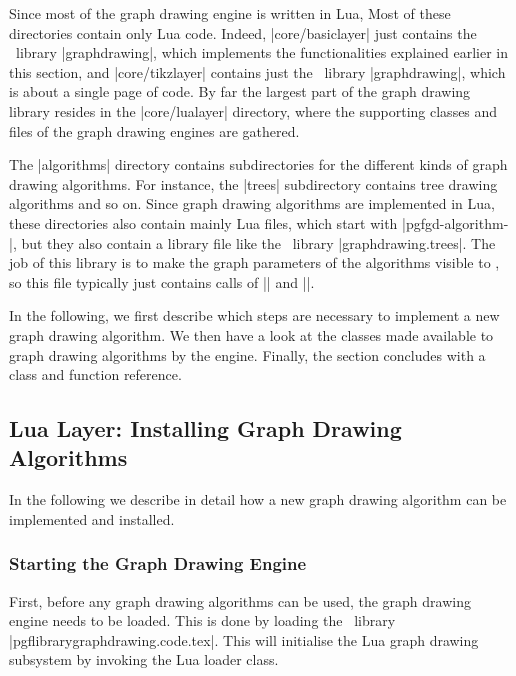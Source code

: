 Since most of the graph drawing engine is written in Lua, Most of
these directories contain only Lua code. Indeed, |core/basiclayer|
just contains the \pgfname\ library |graphdrawing|, which implements
the functionalities explained earlier in this section, and
|core/tikzlayer| contains just the \tikzname\ library |graphdrawing|,
which is about a single page of code. By far the largest part of the
graph drawing library resides in the |core/lualayer| directory, where
the supporting classes and files of the graph drawing engines are
gathered.

The |algorithms| directory contains subdirectories for the different
kinds of graph drawing algorithms. For instance, the |trees|
subdirectory contains tree drawing algorithms and so on. Since graph
drawing algorithms are implemented in Lua, these directories also
contain mainly Lua files, which start with |pgfgd-algorithm-|, but
they also contain a library file like the \pgfname\ library
|graphdrawing.trees|. The job of this library is to make the graph
parameters of the algorithms visible to \pgfname, so this file
typically just contains calls of |\pgfgddeclarealgorithmkey| and
|\pgfgddeclareforwardedkeys|.

In the following, we first describe which steps are necessary to
implement a new graph drawing algorithm. We then have a look at the
classes made available to graph drawing algorithms by the
engine. Finally, the section concludes with a class and function
reference.



\subsection{Lua Layer: Installing Graph Drawing Algorithms}
\label{section-gd-implementing-algorithms}

In the following we describe in detail how a new graph drawing
algorithm can be implemented and installed. 


\subsubsection{Starting the Graph Drawing Engine}

First, before any graph drawing algorithms can be used, the graph
drawing engine needs to be loaded. This is done by loading the
\pgfname\ library |pgflibrarygraphdrawing.code.tex|. This will
initialise the Lua graph drawing subsystem by invoking the Lua loader
class.   

